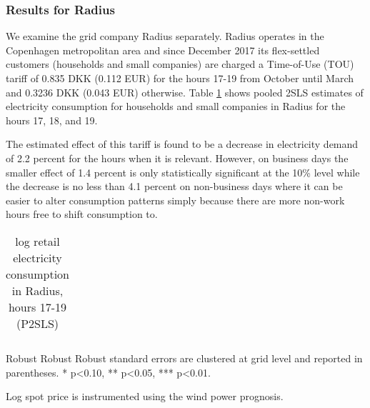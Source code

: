 \subsubsection{Results for Radius}
We examine the grid company Radius separately. Radius operates in the Copenhagen metropolitan area and since December 2017 its flex-settled customers (households and small companies) are charged a Time-of-Use (TOU) tariff of 0.835 DKK (0.112 EUR) for the hours 17-19 from October until March and 0.3236 DKK (0.043 EUR) otherwise. Table \ref{tab:r_radius} shows pooled 2SLS estimates of electricity consumption for households and small companies in Radius for the hours 17, 18, and 19.
\par
The estimated effect of this tariff is found to be a decrease in electricity demand of 2.2 percent for the hours when it is relevant. However, on business days the smaller effect of 1.4 percent is only statistically significant at the 10\% level while the decrease is no less than 4.1 percent on non-business days where it can be easier to alter consumption patterns simply because there are more non-work hours free to shift consumption to.
\begin{table}[H]
\centering
\begin{threeparttable}
  \vspace{-0.0cm}
  \caption{log retail electricity consumption in Radius, hours 17-19 (P2SLS)}
  \label{tab:r_radius}
      \footnotesize
  \begin{tabular}{lccc}
        
  \end{tabular}
    \begin{tablenotes}
        \item  Robust Robust Robust standard errors are clustered at grid level and reported in parentheses. * p<0.10, ** p<0.05, *** p<0.01.
         \item Log spot price is instrumented using the wind power prognosis.
    \end{tablenotes}
  \vspace{-0.0cm}
  \end{threeparttable}
\end{table}


